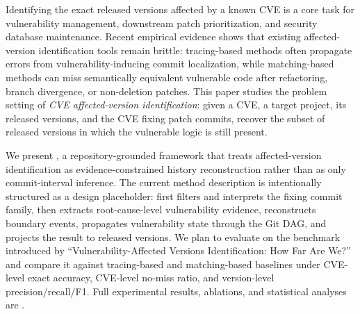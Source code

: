 Identifying the exact released versions affected by a known CVE is a core task for vulnerability management, downstream patch prioritization, and security database maintenance. Recent empirical evidence shows that existing affected-version identification tools remain brittle: tracing-based methods often propagate errors from vulnerability-inducing commit localization, while matching-based methods can miss semantically equivalent vulnerable code after refactoring, branch divergence, or non-deletion patches. This paper studies the problem setting of \emph{CVE affected-version identification}: given a CVE, a target project, its released versions, and the CVE fixing patch commits, recover the subset of released versions in which the vulnerable logic is still present.

We present \toolname, a repository-grounded framework that treats affected-version identification as evidence-constrained history reconstruction rather than as only commit-interval inference. The current method description is intentionally structured as a design placeholder: \toolname first filters and interprets the fixing commit family, then extracts root-cause-level vulnerability evidence, reconstructs boundary events, propagates vulnerability state through the Git DAG, and projects the result to released versions. We plan to evaluate \toolname on the benchmark introduced by ``Vulnerability-Affected Versions Identification: How Far Are We?'' and compare it against tracing-based and matching-based baselines under CVE-level exact accuracy, CVE-level no-miss ratio, and version-level precision/recall/F1. Full experimental results, ablations, and statistical analyses are .

